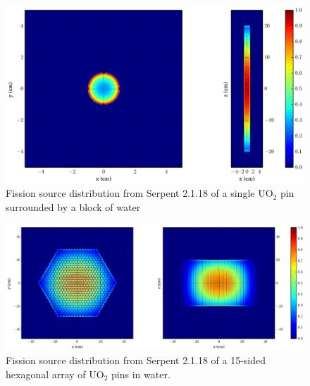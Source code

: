 \begin{figure}[h!] 
  \centering
    \includegraphics[width=\textwidth,trim= 10cm 0cm 6cm 0cm]{graphics/finalresults/pincell_fiss_serp-6.eps}
     \caption{Fission source distribution from Serpent 2.1.18 of a single UO$_2$ pin surrounded by a block of water  \label{serp_pincell_mesh} }
\end{figure}

\begin{figure}[h!] 
  \centering
    \includegraphics[width=\textwidth,trim= 4cm 0cm 6cm 0cm]{graphics/finalresults/assembly_fiss_serp-6.eps}
     \caption{Fission source distribution from Serpent 2.1.18 of a 15-sided hexagonal array of UO$_2$ pins in water. \label{serp_assembly_mesh} }
\end{figure}
